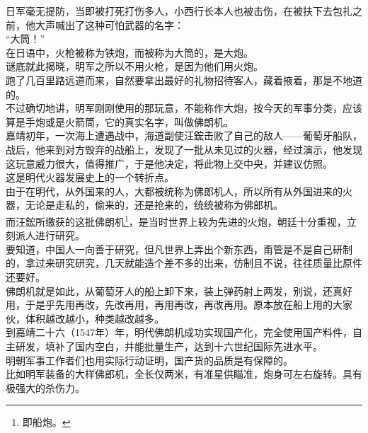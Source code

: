 \begin{multicols}{\theparacolNo}
日军毫无提防，当即被打死打伤多人，小西行长本人也被击伤，在被扶下去包扎之前，他大声喊出了这种可怕武器的名字：\\

“大筒！”\\

在日语中，火枪被称为铁炮，而被称为大筒的，是大炮。\\

谜底就此揭晓，明军之所以不用火枪，是因为他们用火炮。\\

跑了几百里路远道而来，自然要拿出最好的礼物招待客人，藏着掖着，那是不地道的。\\

不过确切地讲，明军刚刚使用的那玩意，不能称作大炮，按今天的军事分类，应该算是手炮或是火箭筒，它的真实名字，叫做佛朗机。\\

嘉靖初年，一次海上遭遇战中，海道副使汪鋐击败了自己的敌人——葡萄牙船队，战后，他来到对方毁弃的战船上，发现了一批从未见过的火器，经过演示，他发现这玩意威力很大，值得推广，于是他决定，将此物上交中央，并建议仿照。\\

这是明代火器发展史上的一个转折点。\\

由于在明代，从外国来的人，大都被统称为佛郎机人，所以所有从外国进来的火器，无论是走私的，偷来的，还是抢来的，统统被称为佛郎机。\\

而汪鋐所缴获的这批佛朗机\footnote{即船炮。}，是当时世界上较为先进的火炮，朝廷十分重视，立刻派人进行研究。\\

要知道，中国人一向善于研究，但凡世界上弄出个新东西，甭管是不是自己研制的，拿过来研究研究，几天就能造个差不多的出来，仿制且不说，往往质量比原件还要好。\\

佛朗机就是如此，从葡萄牙人的船上卸下来，装上弹药射上两发，别说，还真好用，于是乎先用再改，先改再用，再用再改，再改再用。原本放在船上用的大家伙，体积越改越小，种类越改越多。\\

到嘉靖二十六（1547年）年，明代佛朗机成功实现国产化，完全使用国产料件，自主研发，填补了国内空白，并能批量生产，达到十六世纪国际先进水平。\\

明朝军事工作者们也用实际行动证明，国产货的品质是有保障的。\\

比如明军装备的大样佛郎机，全长仅两米，有准星供瞄准，炮身可左右旋转。具有极强大的杀伤力。\\


\end{multicols}
